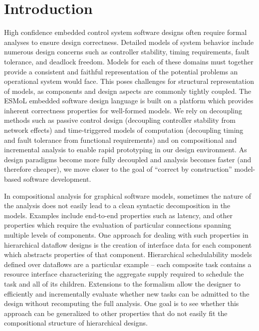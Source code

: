 \section{Introduction}

High confidence embedded control system software designs often require formal 
analyses to ensure design correctness.  Detailed models of system behavior 
include numerous design concerns such as controller stability, timing 
requirements, fault tolerance, and deadlock freedom.  Models for each of these
domains must together provide a consistent and faithful representation of the
potential problems an operational system would face.  This poses challenges 
for structural representation of models, as components and design
aspects are commonly tightly coupled.  The ESMoL embedded software design language is built on a platform which provides inherent correctness properties for well-formed models.   We rely on decoupling methods such as passive control design (decoupling controller stability from network effects) and time-triggered models of computation (decoupling timing and fault tolerance from functional requirements) and on compositional and incremental analysis to enable rapid prototyping in our design environment.  As design paradigms become more fully decoupled and analysis becomes faster (and therefore cheaper), we move closer to the goal of ``correct by construction'' model-based software development.

In compositional analysis for graphical software models, sometimes the nature of the analysis does not easily lead to a clean syntactic decomposition in the models.  Examples include end-to-end properties such as latency, and other properties which require the evaluation of particular connections spanning multiple levels of components.  One approach for dealing with such properties in hierarchical dataflow designs is the creation of interface data for each component which abstracts properties of that component.  Hierarchical schedulability models defined over dataflows are a particular example\cite{sched:shin} -- each composite task contains a resource interface characterizing the aggregate supply required to schedule the task and all of its children.  Extensions to the formalism allow the designer to efficiently and incrementally evaluate whether new tasks can be admitted to the design without recomputing the full analysis\cite{sched:easwaran}.  One goal is to see whether this approach can be generalized to other properties that do not easily fit the compositional structure of hierarchical designs.
 
